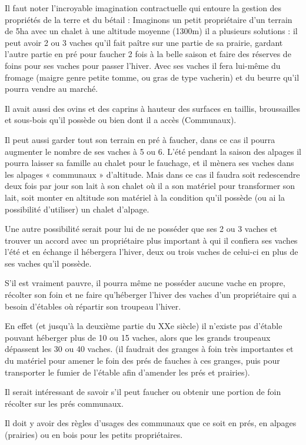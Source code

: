 \documentclass[12pt,a4paper]{report}
\begin{document}
Il faut noter l'incroyable imagination contractuelle qui entoure la gestion des propriétés de la terre et du bétail : Imaginons un petit propriétaire d’un terrain de 5ha avec un chalet à une altitude moyenne (1300m) il a plusieurs solutions : il peut avoir 2 ou 3 vaches qu’il fait paître sur une partie de sa prairie, gardant l’autre partie en pré pour faucher 2 fois à la belle saison et faire des réserves de foins pour ses vaches pour passer l’hiver. Avec ses vaches il fera lui-même du fromage (maigre genre petite tomme, ou gras de type vacherin) et du beurre qu’il pourra vendre au marché.

Il avait aussi des ovins et des caprins à hauteur des surfaces en taillis, broussailles et sous-bois qu’il possède ou bien dont il a accès (Communaux).

Il peut aussi garder tout son terrain en pré à faucher, dans ce cas il pourra augmenter le nombre de ses vaches à 5 ou 6. L’été pendant la saison des alpages il pourra laisser sa famille au chalet pour le fauchage, et il mènera ses vaches dans les alpages « communaux » d’altitude. Mais dans ce cas il faudra soit redescendre deux fois par jour son lait à son chalet où il a son matériel pour transformer son lait, soit monter en altitude son matériel à la condition qu'il possède (ou ai la possibilité d'utiliser) un chalet d'alpage.

Une autre possibilité serait pour lui de ne posséder que ses 2 ou 3 vaches et trouver un accord avec un propriétaire plus important à qui il confiera ses vaches l’été et en échange il hébergera l’hiver, deux ou trois vaches de celui-ci en plus de ses vaches qu’il possède.

S’il est vraiment pauvre, il pourra même ne posséder aucune vache en propre, récolter son foin et ne faire qu’héberger l’hiver des vaches d’un propriétaire qui a besoin d’étables où répartir son troupeau l’hiver.

En effet (et jusqu'à la deuxième partie du XXe siècle) il n’existe pas d’étable pouvant héberger plus de 10 ou 15 vaches, alors que les grands troupeaux dépassent les 30 ou 40 vaches. (il faudrait des granges à foin très importantes et du matériel pour amener le foin des prés de fauches à ces granges, puis pour transporter le fumier de l’étable afin d’amender les prés et prairies).

Il serait intéressant de savoir s’il peut faucher ou obtenir une portion de foin récolter sur les prés communaux.

Il doit y avoir des règles d’usages des communaux que ce soit en prés, en alpages (prairies) ou en bois pour les petits propriétaires.
\end{document}
